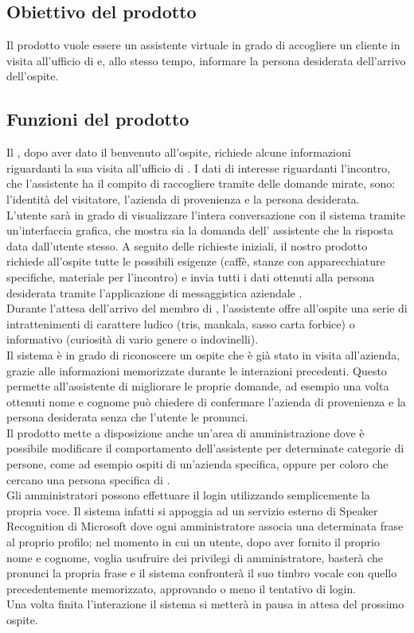 \subsection{Obiettivo del prodotto}
Il prodotto vuole essere un assistente virtuale in grado di accogliere un cliente in visita all'ufficio di \PROPONENTE{} e, allo stesso tempo, informare la persona desiderata dell'arrivo dell'ospite. 
\subsection{Funzioni del prodotto}
Il , dopo aver dato il benvenuto all'ospite, richiede alcune informazioni riguardanti la sua visita all'ufficio di \PROPONENTE. I dati di interesse riguardanti l'incontro, che l'assistente ha il compito di raccogliere tramite delle domande mirate, sono: l'identità del visitatore, l'azienda di provenienza e la persona desiderata.\\
L'utente sarà in grado di visualizzare l'intera conversazione con il sistema tramite un'interfaccia grafica, che mostra sia la domanda dell' assistente che la risposta data dall'utente stesso.
A seguito delle richieste iniziali, il nostro prodotto richiede all'ospite tutte le possibili esigenze (caffè, stanze con apparecchiature specifiche, materiale per l'incontro) e invia tutti i dati ottenuti alla persona desiderata tramite l'applicazione di messaggistica aziendale .\\
Durante l'attesa dell'arrivo del membro di \PROPONENTE{}, l'assistente offre all'ospite una serie di intrattenimenti di carattere ludico (tris, mankala, sasso carta forbice) o informativo (curiosità di vario genere o indovinelli).\\
Il sistema è in grado di riconoscere un ospite che è già stato in visita all'azienda, grazie alle informazioni memorizzate durante le interazioni precedenti. Questo permette all'assistente di migliorare le proprie domande, ad esempio una volta ottenuti nome e cognome può chiedere di confermare l'azienda di provenienza e la persona desiderata senza che l'utente le pronunci.\\
Il prodotto mette a disposizione anche un'area di amministrazione dove è possibile modificare il comportamento dell'assistente per determinate categorie di persone, come ad esempio ospiti di un'azienda specifica, oppure per coloro che cercano una persona specifica di \PROPONENTE{}. \\
Gli amministratori possono effettuare il login utilizzando semplicemente la propria voce. Il sistema infatti si appoggia ad un servizio esterno di Speaker Recognition di Microsoft dove ogni amministratore associa una determinata frase al proprio profilo; nel momento in cui un utente, dopo aver fornito il proprio nome e cognome, voglia usufruire dei privilegi di amministratore, basterà che pronunci la propria frase e il sistema confronterà il suo timbro vocale con quello precedentemente memorizzato, approvando o meno il tentativo di login.\\
Una volta finita l'interazione il sistema si metterà in pausa in attesa del prossimo ospite.
